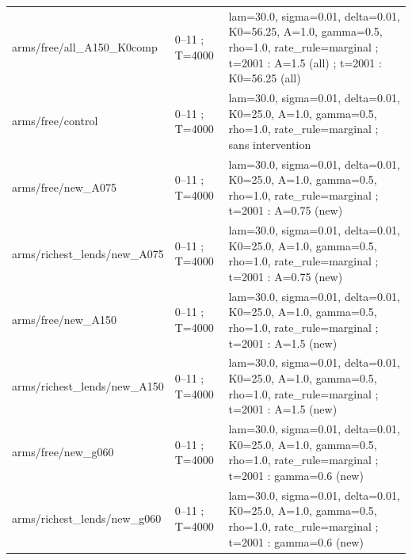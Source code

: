 {\begin{longtable}{@{}p{.27\linewidth}p{.14\linewidth}p{.53\linewidth}@{}}
arms/\allowbreak{}free/\allowbreak{}all\_\allowbreak{}A150\_\allowbreak{}K0comp & 0--11 ; T=4000 & lam=30.0,\allowbreak{}  sigma=0.01,\allowbreak{}  delta=0.01,\allowbreak{}  K0=56.25,\allowbreak{}  A=1.0,\allowbreak{}  gamma=0.5,\allowbreak{}  rho=1.0,\allowbreak{}  rate\_\allowbreak{}rule=marginal ; t=2001 : A=1.5 (all) ; t=2001 : K0=56.25 (all) \\
arms/\allowbreak{}free/\allowbreak{}control & 0--11 ; T=4000 & lam=30.0,\allowbreak{}  sigma=0.01,\allowbreak{}  delta=0.01,\allowbreak{}  K0=25.0,\allowbreak{}  A=1.0,\allowbreak{}  gamma=0.5,\allowbreak{}  rho=1.0,\allowbreak{}  rate\_\allowbreak{}rule=marginal ; sans intervention \\
arms/\allowbreak{}free/\allowbreak{}new\_\allowbreak{}A075 & 0--11 ; T=4000 & lam=30.0,\allowbreak{}  sigma=0.01,\allowbreak{}  delta=0.01,\allowbreak{}  K0=25.0,\allowbreak{}  A=1.0,\allowbreak{}  gamma=0.5,\allowbreak{}  rho=1.0,\allowbreak{}  rate\_\allowbreak{}rule=marginal ; t=2001 : A=0.75 (new) \\
arms/\allowbreak{}richest\_\allowbreak{}lends/\allowbreak{}new\_\allowbreak{}A075 & 0--11 ; T=4000 & lam=30.0,\allowbreak{}  sigma=0.01,\allowbreak{}  delta=0.01,\allowbreak{}  K0=25.0,\allowbreak{}  A=1.0,\allowbreak{}  gamma=0.5,\allowbreak{}  rho=1.0,\allowbreak{}  rate\_\allowbreak{}rule=marginal ; t=2001 : A=0.75 (new) \\
arms/\allowbreak{}free/\allowbreak{}new\_\allowbreak{}A150 & 0--11 ; T=4000 & lam=30.0,\allowbreak{}  sigma=0.01,\allowbreak{}  delta=0.01,\allowbreak{}  K0=25.0,\allowbreak{}  A=1.0,\allowbreak{}  gamma=0.5,\allowbreak{}  rho=1.0,\allowbreak{}  rate\_\allowbreak{}rule=marginal ; t=2001 : A=1.5 (new) \\
arms/\allowbreak{}richest\_\allowbreak{}lends/\allowbreak{}new\_\allowbreak{}A150 & 0--11 ; T=4000 & lam=30.0,\allowbreak{}  sigma=0.01,\allowbreak{}  delta=0.01,\allowbreak{}  K0=25.0,\allowbreak{}  A=1.0,\allowbreak{}  gamma=0.5,\allowbreak{}  rho=1.0,\allowbreak{}  rate\_\allowbreak{}rule=marginal ; t=2001 : A=1.5 (new) \\
arms/\allowbreak{}free/\allowbreak{}new\_\allowbreak{}g060 & 0--11 ; T=4000 & lam=30.0,\allowbreak{}  sigma=0.01,\allowbreak{}  delta=0.01,\allowbreak{}  K0=25.0,\allowbreak{}  A=1.0,\allowbreak{}  gamma=0.5,\allowbreak{}  rho=1.0,\allowbreak{}  rate\_\allowbreak{}rule=marginal ; t=2001 : gamma=0.6 (new) \\
arms/\allowbreak{}richest\_\allowbreak{}lends/\allowbreak{}new\_\allowbreak{}g060 & 0--11 ; T=4000 & lam=30.0,\allowbreak{}  sigma=0.01,\allowbreak{}  delta=0.01,\allowbreak{}  K0=25.0,\allowbreak{}  A=1.0,\allowbreak{}  gamma=0.5,\allowbreak{}  rho=1.0,\allowbreak{}  rate\_\allowbreak{}rule=marginal ; t=2001 : gamma=0.6 (new) \\

\end{longtable}}
